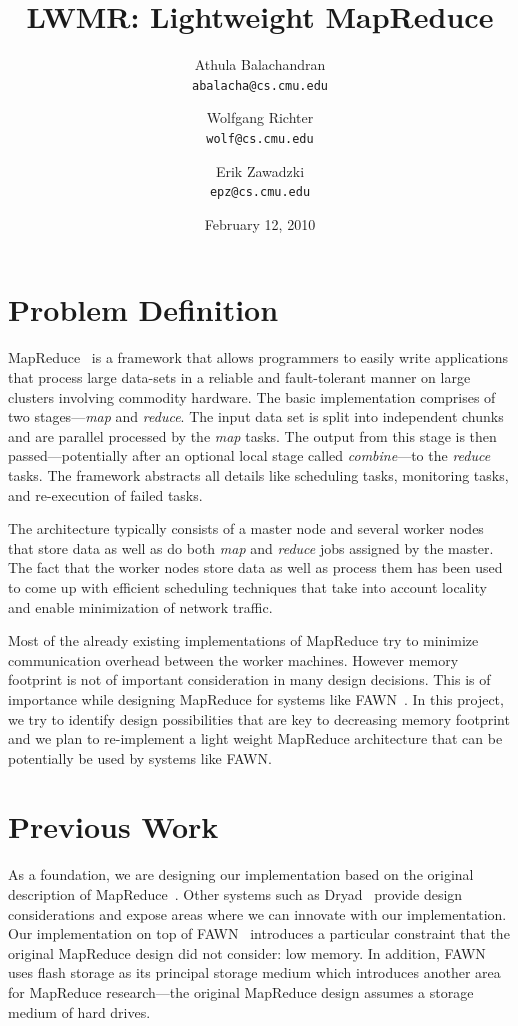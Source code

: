 \documentclass[10pt,letter,final,article,twocolumn]{article} %
\title{LWMR: Lightweight MapReduce}
\author{Athula Balachandran \\
{\tt abalacha@cs.cmu.edu}
\and
Wolfgang Richter \\
{\tt wolf@cs.cmu.edu}
\and
Erik Zawadzki \\
{\tt epz@cs.cmu.edu}}
\date{February 12, 2010} %
\begin{document}
\pagestyle{empty}
\maketitle
\thispagestyle{empty}

\section{Problem Definition}
MapReduce~\citep{mapreduce08} is a framework that allows programmers to easily write applications that process large data-sets in a reliable and fault-tolerant manner on large clusters involving commodity hardware. The basic implementation  comprises of two stages---\emph{map} and \emph{reduce}. The input data set is split into independent chunks and are parallel processed by the \emph{map} tasks. The output from this stage is then passed---potentially after an optional local stage called \emph{combine}---to the \emph{reduce} tasks. The framework abstracts all details like scheduling tasks, monitoring tasks, and re-execution of failed tasks. 

The architecture typically consists of a master node and several worker nodes that store data as well as do both \emph{map} and \emph{reduce} jobs assigned by the master. The fact that the worker nodes store data as well as process them has been used to come up with efficient scheduling techniques that take into account locality and enable minimization of network traffic.

Most of the already existing implementations of MapReduce try to minimize communication overhead between the worker machines. However memory footprint is not of important consideration in many design decisions. This is of importance while designing MapReduce for systems like FAWN~\citep{fawn09}. In this project, we try to identify design possibilities that are key to decreasing memory footprint and we plan to re-implement a light weight MapReduce architecture that can be potentially be used by systems like FAWN.

\section{Previous Work}

As a foundation, we are designing our implementation based on the original 
description of MapReduce~\citep{mapreduce08}.  Other systems such as
Dryad~\citep{dryad07} provide design considerations and expose areas
where we can innovate with our implementation.  Our implementation on top
of FAWN~\citep{fawn09} introduces a particular constraint that the original
MapReduce design did not consider: low memory.  In addition, FAWN uses
flash storage as its principal storage medium which introduces another
area for MapReduce research---the original MapReduce design assumes a
storage medium of hard drives.  
\end{document}
